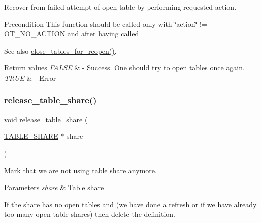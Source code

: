 Recover from failed attempt of open table by performing requested action.

\begin{DoxyPrecond}{Precondition}
This function should be called only with \char`\"{}action\char`\"{} != O\+T\+\_\+\+N\+O\+\_\+\+A\+C\+T\+I\+ON and after having called 
\end{DoxyPrecond}
\begin{DoxySeeAlso}{See also}
\mbox{\hyperlink{group__Data__Dictionary_ga92bec964ecaaa7270a429e664643b746}{close\+\_\+tables\+\_\+for\+\_\+reopen()}}.
\end{DoxySeeAlso}

\begin{DoxyRetVals}{Return values}
{\em F\+A\+L\+SE} & -\/ Success. One should try to open tables once again. \\
\hline
{\em T\+R\+UE} & -\/ Error \\
\hline
\end{DoxyRetVals}
\mbox{\label{group__Data__Dictionary_ga0f27eb7444d2cec48296785a54e229f2}} 
\subsubsection{\texorpdfstring{release\+\_\+table\+\_\+share()}{release\_table\_share()}}
{\footnotesize\ttfamily void release\+\_\+table\+\_\+share (\begin{DoxyParamCaption}\item[{\mbox{\hyperlink{structTABLE__SHARE}{T\+A\+B\+L\+E\+\_\+\+S\+H\+A\+RE}} $\ast$}]{share }\end{DoxyParamCaption})}

Mark that we are not using table share anymore.


\begin{DoxyParams}{Parameters}
{\em share} & Table share\\
\hline
\end{DoxyParams}
If the share has no open tables and (we have done a refresh or if we have already too many open table shares) then delete the definition. \mbox{\label{group__Data__Dictionary_gaf35889f70c8719510fb76899cf9cf20b}} 
